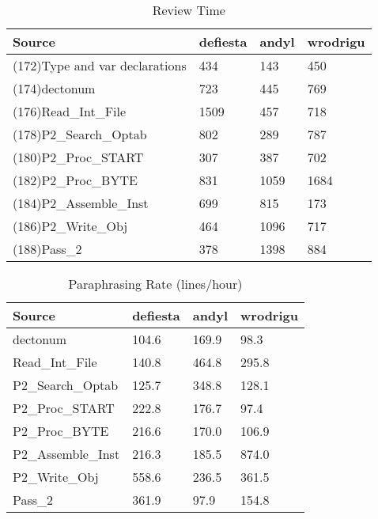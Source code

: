 \begin{table}[hb]
\begin{center}
\begin{tabular}{|l|l|l|l|}
\hline
Source & defiesta & andyl & wrodrigu\\
\hline
(172)Type and var declarations & 434 & 143 & 450\\
(174)dectonum & 723 & 445 & 769\\
(176)Read\_Int\_File & 1509 & 457 & 718\\
(178)P2\_Search\_Optab & 802 & 289 & 787\\
(180)P2\_Proc\_START & 307 & 387 & 702\\
(182)P2\_Proc\_BYTE & 831 & 1059 & 1684\\
(184)P2\_Assemble\_Inst & 699 & 815 & 173\\
(186)P2\_Write\_Obj & 464 & 1096 & 717\\
(188)Pass\_2 & 378 & 1398 & 884\\
\hline
\end{tabular}
\end{center}
\caption{Review Time}
\end{table}

\begin{table}[hb]
\begin{center}
\begin{tabular}{|l|l|l|l|}
\hline
Source & defiesta & andyl & wrodrigu\\
\hline
dectonum & 104.6 & 169.9 & 98.3\\
Read\_Int\_File & 140.8 & 464.8 & 295.8\\
P2\_Search\_Optab & 125.7 & 348.8 & 128.1\\
P2\_Proc\_START & 222.8 & 176.7 & 97.4\\
P2\_Proc\_BYTE & 216.6 & 170.0 & 106.9\\
P2\_Assemble\_Inst & 216.3 & 185.5 & 874.0\\
P2\_Write\_Obj & 558.6 & 236.5 & 361.5\\
Pass\_2 & 361.9 & 97.9 & 154.8\\
\hline
\end{tabular}
\end{center}
\caption{Paraphrasing Rate (lines/hour)}
\end{table}


